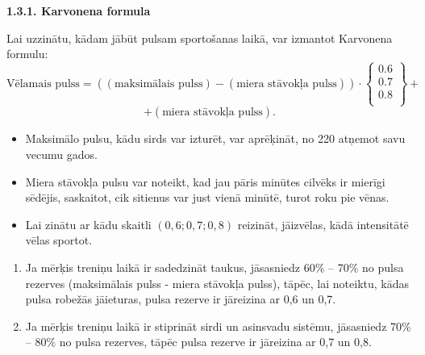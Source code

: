 \documentclass[12pt]{article}
\begin{document}
\begin{center}
{\bf 1.3.1. Karvonena formula}
\end{center}

Lai uzzinātu, kādam jābūt pulsam sportošanas laikā, var izmantot Karvonena formulu: 
$$\text{Vēlamais\ pulss} = ((\text{maksimālais\ pulss})  - (\text{miera\ stāvokļa\ pulss})) \cdot 
\left\{ \begin{array}{c} 0.6\\ 0.7\\ 0.8 \\ \end{array} \right\} +$$
$$ + (\text{miera\ stāvokļa\ pulss}).$$
\begin{itemize}
    \item Maksimālo pulsu, kādu sirds var izturēt, var aprēķināt, no 220 atņemot savu vecumu gados. 
    \item 	Miera stāvokļa pulsu var noteikt, kad jau pāris minūtes cilvēks ir mierīgi sēdējis, saskaitot, cik sitienus var just vienā minūtē, turot roku pie vēnas.
    \item Lai zinātu ar kādu skaitli $(0,6; 0,7; 0,8)$ reizināt, jāizvēlas, kādā intensitātē vēlas sportot.
\end{itemize}
	\begin{enumerate}
	    \item Ja mērķis treniņu laikā ir sadedzināt taukus, jāsasniedz 60\% -- 70\% no pulsa rezerves (maksimālais pulss - miera stāvokļa pulss), tāpēc, lai noteiktu, kādas pulsa robežās jāieturas, pulsa rezerve ir jāreizina ar 0,6 un 0,7.
	    \item Ja mērķis treniņu laikā ir stiprināt sirdi un asinsvadu sistēmu, jāsasniedz 70\% – 80\% no pulsa rezerves, tāpēc pulsa rezerve ir jāreizina ar 0,7 un 0,8.
	\end{enumerate}
	
\end{document}
